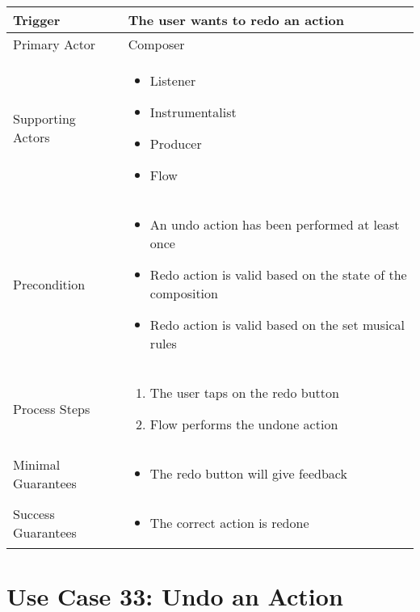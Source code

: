   \begin{tabularx}{\textwidth}{|X|X|}
  \hline
  Trigger & 
  The user wants to redo an action\\
  \hline
  Primary Actor & 
  Composer \\
  \hline
  Supporting Actors & 
  \begin{itemize}
  \item Listener
  \item Instrumentalist
  \item Producer
  \item Flow
  \end{itemize} \\
  \hline
  Precondition & 
  \begin{itemize}
  \item An undo action has been performed at least once
  \item Redo action is valid based on the state of the composition
  \item Redo action is valid based on the set musical rules
  \end{itemize} \\
  \hline
  Process Steps & 
  \begin{enumerate}
  \item The user taps on the redo button
  \item Flow performs the undone action
  \end{enumerate} \\
  \hline
  Minimal Guarantees & 
  \begin{itemize}
    \item The redo button will give feedback 
  \end{itemize}\\
  \hline
  Success Guarantees & 
  \begin{itemize}
    \item The correct action is redone
  \end{itemize} \\
  \hline
  \end{tabularx}

  \section{Use Case 33: Undo an Action}

